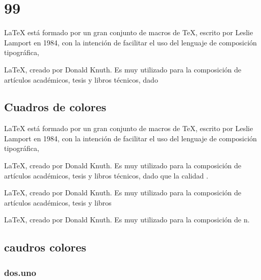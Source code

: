 \chapter{99}


	\LaTeX{} está formado por un gran conjunto de macros de TeX, escrito por Leslie Lamport en 1984, con la intención de facilitar el uso del lenguaje de composición tipográfica, 

	\LaTeX{}, creado por Donald Knuth. Es muy utilizado para la composición de artículos académicos, tesis y libros técnicos, dado 

\section{Cuadros de colores}

	\LaTeX{} está formado por un gran conjunto de macros de TeX, escrito por Leslie Lamport en 1984, con la intención de facilitar el uso del lenguaje de composición tipográfica, 

\begin{destacado}
		\LaTeX{}, creado por Donald Knuth. Es muy utilizado para la composición de artículos académicos, tesis y libros técnicos, dado que la calidad .
\end{destacado}


\begin{destacadof}
		\LaTeX{}, creado por Donald Knuth. Es muy utilizado para la composición de artículos académicos, tesis y libros 
\end{destacadof}


		\LaTeX{}, creado por Donald Knuth. Es muy utilizado para la composición de n.





\section{caudros colores}

\subsection{dos.uno}
